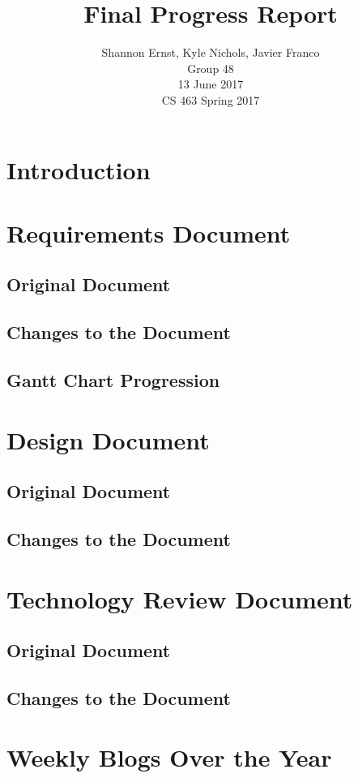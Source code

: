 \documentclass[letterpaper,10pt,serif,draftclsnofoot,onecolumn,compsoc,titlepage]{IEEEtran}
\title{Final Progress Report}
\author{Shannon Ernst, Kyle Nichols, Javier Franco\\ Group 48 \\ 13 June 2017 \\ CS 463 Spring 2017}
\begin{document}
\maketitle
\begin{abstract}

\end{abstract}
\newpage
\tableofcontents
\newpage
\section{Introduction}
\section{Requirements Document}
\subsection{Original Document}
\subsection{Changes to the Document}
\subsection{Gantt Chart Progression}
\section{Design Document}
\subsection{Original Document}
\subsection{Changes to the Document}
\section{Technology Review Document}
\subsection{Original Document}
\subsection{Changes to the Document}
\section{Weekly Blogs Over the Year}
\end{document}
